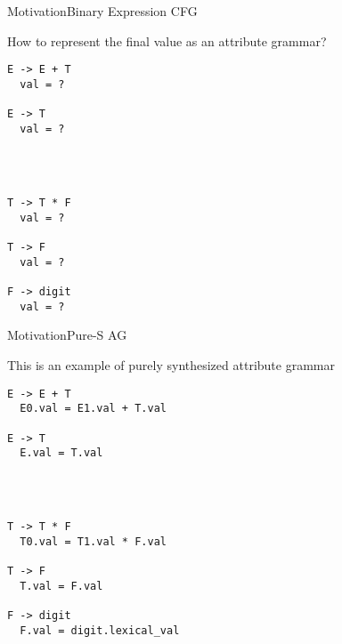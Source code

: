 
\begin{frame}[fragile=singleslide]{Motivation}{Binary Expression CFG}

How to represent the \alert{final value} as an attribute grammar?

\begin{multicols}{2}
\begin{Verbatim}[fontsize=\small]
E -> E + T
  val = ?

E -> T
  val = ?




T -> T * F
  val = ?

T -> F
  val = ?

F -> digit
  val = ?
\end{Verbatim}
\end{multicols}
\end{frame}



\begin{frame}[fragile=singleslide]{Motivation}{Pure-S AG}

This is an example of \alert{purely synthesized} attribute grammar

\begin{multicols}{2}
\begin{Verbatim}[fontsize=\small]
E -> E + T
  E0.val = E1.val + T.val

E -> T
  E.val = T.val




T -> T * F
  T0.val = T1.val * F.val

T -> F
  T.val = F.val

F -> digit
  F.val = digit.lexical_val
\end{Verbatim}
\end{multicols}

\end{frame}

